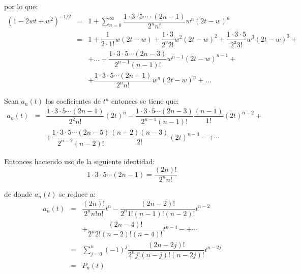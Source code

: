 \documentclass{article}
\begin{document}
por lo que:\\

\begin{equation*}
\begin{array}{lll}
(1-2wt+w^{2})^{-1/2}&=&1+\sum\limits_{n=0}^\infty\dfrac{1\cdot3\cdot5\cdots\cdot(2n-1)}{2^{n}n!}w^{n}(2t-w)^{n}\\
 &=&1+\dfrac{1}{2\cdot1!}w(2t-w)+\dfrac{1\cdot3}{2^{2}2!}w^{2}(2t-w)^{2}+\dfrac{1\cdot3\cdot5}{2^{3}3!}w^{3}(2t-w)^{3}+\\
  & &+...+\dfrac{1\cdot3\cdot5\cdots(2n-3)}{2^{n-1}(n-1)!}w^{n-1}(2t-w)^{n-1}+\\
   & &+\dfrac{1\cdot3\cdot5\cdots(2n-1)}{2^{n}n!}w^{n}(2t-w)^{n}+... 
\end{array}
\end{equation*}

Sean $a_{n}(t)$ los coeficientes de $t^{n}$ entonces se tiene que:\\

\begin{equation*}
	\begin{array}{lll}
	a_{n}(t)&=&\dfrac{1\cdot3\cdot5\cdots(2n-1)}{2^{2}n!}(2t)^{n}-\dfrac{1\cdot3\cdot5\cdots(2n-3)}{2^{n-1}(n-1)!}\dfrac{(n-1)}{1!}(2t)^{n-2}+\\
	& &+\dfrac{1\cdot3\cdot5\cdots(2n-5)}{2^{n-2}(n-2)!}\dfrac{(n-2)(n-3)}{2!}(2t)^{n-4}-+\cdots
	\end{array}
\end{equation*}

Entonces haciendo uso de la siguiente identidad:\\

\begin{equation*}
1\cdot3\cdot5\cdots(2n-1)=\dfrac{(2n)!}{2^{n}n!}
\end{equation*}

de donde $a_{n}(t)$ se reduce a:\\

\begin{equation*}
\begin{array}{lll}
a_{n}(t)&=&\dfrac{(2n)!}{2^{n}n!n!}t^{n}-\dfrac{(2n-2)!}{2^{n}1!(n-1)!(n-2)!}t^{n-2}\\
&&+\dfrac{(2n-4)!}{2^{n}2!(n-2)!(n-4)!}t^{n-4}-+\cdots\\
&=&\sum\limits_{j=0}^{n}(-1)^{j}\dfrac{(2n-2j)!}{2^{n}j!(n-j)!(n-2j)!}t^{n-2j}\\
&=&P_{n}(t)
\end{array}
\end{equation*}
\end{document}
